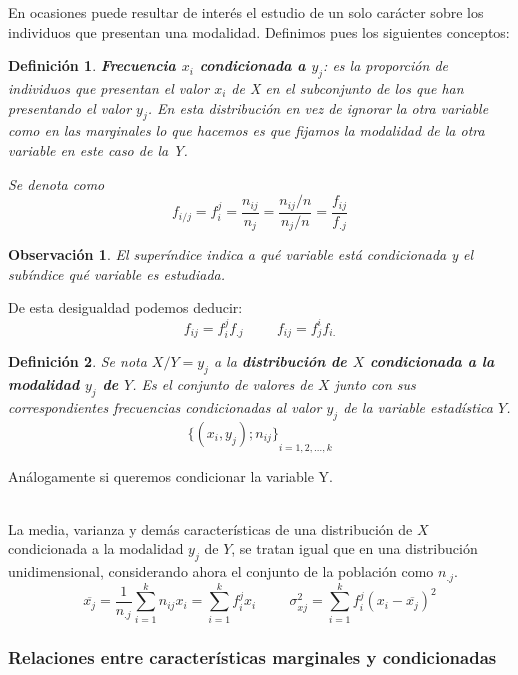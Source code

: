 \documentclass[10pt, a4paper]{article}
\theoremstyle{theorem-style}
\theoremstyle{definition-style}
\newtheorem{ndef}{Definición}[section]
\theoremstyle{remark-style}
\newtheorem*{nota}{Observación}
\theoremstyle{example-style}
\theoremstyle{definition-style}
\theoremstyle{remark-style}
\begin{document}
	En ocasiones puede resultar de interés el estudio de un solo carácter sobre
	los individuos que presentan una modalidad. Definimos pues los siguientes conceptos:
\begin{ndef}
	\textbf{Frecuencia $x_i$ condicionada a $y_j$}: es la proporción de individuos
	que presentan el valor $x_i$ de X en el subconjunto de los que han presentando
	el valor $y_j$. En esta distribución en vez de ignorar la otra variable como
	en las marginales lo que hacemos es que fijamos la modalidad de la otra
	variable en este caso de la Y.

	Se denota como $$ f_{i/j} = f_i^j = \frac{n_{ij} } {n_j} =
	\frac{n_{ij}/n}{n_j/n} = \frac{f_{ij}}{f_{.j}} $$
\end{ndef}

\begin{nota}
	El superíndice indica a qué variable está condicionada y el subíndice qué
	variable es estudiada.
\end{nota}
	
	
\pagebreak

	De esta desigualdad podemos deducir:
	$$ f_{ij} = f_i^j f_{.j} \hspace{1cm} f_{ij} = f_j^i f_{i.} $$

\begin{ndef}
	Se nota $X/Y=y_j$ a la \textbf{distribución de $X$ condicionada a la modalidad $y_j$
	de $Y$}. Es el conjunto de valores de $X$ junto con sus correspondientes
	frecuencias condicionadas al valor $y_j$ de la variable estadística $Y$.
	$$
	{\{(x_i, y_j); n_{ij}\}}_{i=1,2,\dots,k}
	$$
\end{ndef}

	Análogamente si queremos condicionar la variable Y.
	
	\hspace{1cm}\\

	La media, varianza y demás características de una distribución de $X$
	condicionada a la modalidad $y_j$ de $Y$, se tratan igual que en una
	distribución unidimensional, considerando ahora el conjunto de la población
	como $n_{.j}$.
	$$ \overline{x_j} = \frac{1}{n_{.j}} \sum_{i=1}^k n_{ij} x_i = \sum_{i=1}^k
	f_i^j x_i \hspace{1cm} \sigma_{xj}^2 = \sum_{i=1}^k f_i^j {(x_i - \overline{x_j})}^2 $$

\subsubsection{Relaciones entre características marginales y condicionadas}
\end{document}
